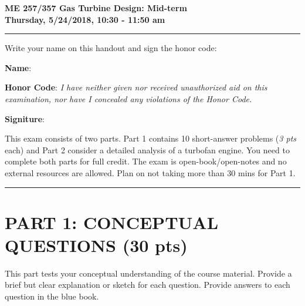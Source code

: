 \documentclass[11pt]{article}
\begin{document}
\begin{center}
{\Large\bf ME 257/357 Gas Turbine Design: Mid-term\\
       Thursday, 5/24/2018, 10:30 - 11:50 am}
\end{center}

\hrule
\vspace{2mm}
\noindent Write your name on this handout and sign the honor code:

\vspace{6mm}
\noindent \textbf{Name}: \dotfill %
\vspace{2mm}

\noindent \textbf{Honor Code}: \emph{I have neither given nor received unauthorized aid on this examination, nor have I concealed any violations of the Honor Code.}

\vspace{6mm}
\noindent \textbf{Signiture}: \dotfill %

\vspace{2mm}
\noindent This exam consists of two parts. Part 1 contains 10 short-answer problems (\emph{3 pts} each) and Part 2 consider a detailed analysis of a turbofan engine. You need to complete both parts for full credit. The exam is open-book/open-notes and no external resources are allowed. Plan on not taking more than 30 mins for Part 1. 
\vspace{2mm}
\hrule

\vspace{2mm}

\section*{\textbf{PART 1:} CONCEPTUAL QUESTIONS (30 pts)} %
\label{sec:_textbf_part_1_short_answers}
This part tests your conceptual understanding of the course material. Provide a brief but clear explanation or sketch for each question. Provide answers to each question in the blue book.
\end{document}
